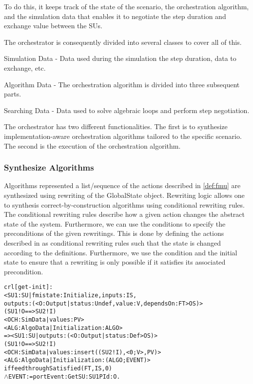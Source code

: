 To do this, it keeps track of the state of the scenario, the orchestration algorithm, and the simulation data that enables it to negotiate the step duration and exchange value between the SUs.

The orchestrator is consequently divided into several classes to cover all of this.
\begin{compactitem}
  \item Simulation Data - Data used during the simulation the step duration, data to exchange, etc.
  \item Algorithm Data - The orchestration algorithm is divided into three subsequent parts. 
  \item Searching Data - Data used to solve algebraic loops and perform step negotiation.
\end{compactitem}

The orchestrator has two different functionalities.
The first is to synthesize implementation-aware orchestration algorithms tailored to the specific scenario.
The second is the execution of the orchestration algorithm. 

\subsubsection{Synthesize Algorithms}
Algorithms represented a list/sequence of the actions described in \cref{def:fmu} are synthesized using rewriting of the GlobalState object.
Rewriting logic allows one to synthesis correct-by-construction algorithms using conditional rewriting rules.
The conditional rewriting rules describe how a given action changes the abstract state of the system.
Furthermore, we can use the conditions to specify the preconditions of the given rewritings.
This is done by defining the actions described in  as conditional rewriting rules such that the state is changed according to the definitions.
Furthermore, we use the condition and the initial state to ensure that a rewriting is only possible if it satisfies its associated precondition.

\begin{alltt}
  \small
  crl [get-init] :
  < SU1 : SU | fmistate : Initialize, inputs : IS, 
    outputs : (< O : Output | status : Undef, value : V, dependsOn : FT > OS) > 
  (SU1 ! O ==> SU2 ! I)
  < OCH : SimData | values : PV > 
  < ALG : AlgoData | Initialization : ALGO >
  => < SU1 : SU | outputs : (< O : Output | status : Def > OS) > 
    (SU1 ! O ==> SU2 ! I)
    < OCH : SimData | values : insert((SU2 ! I), < 0 ; V >, PV) >  
    < ALG : AlgoData | Initialization : (ALGO ; EVENT) >
if feedthroughSatisfied(FT, IS, 0)
  \(\land\) EVENT := portEvent: Get SU: SU1 PId: O . 
\end{alltt}

